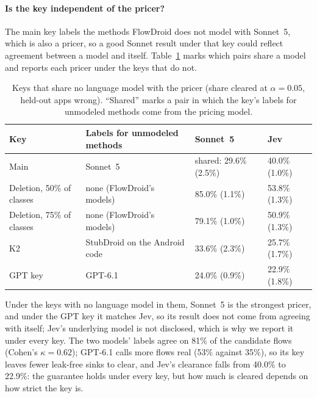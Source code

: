 \paragraph{Is the key independent of the pricer?}
The main key labels the methods FlowDroid does not model with Sonnet~5, which is also a pricer, so a good Sonnet result under that key could reflect agreement between a model and itself.
Table~\ref{tab:indep} marks which pairs share a model and reports each pricer under the keys that do not.
\begin{table}[t]
\caption{Keys that share no language model with the pricer (share cleared at $\alpha=0.05$, held-out apps wrong). ``Shared'' marks a pair in which the key's labels for unmodeled methods come from the pricing model.}
\label{tab:indep}
\small
\begin{tabular}{@{}llll@{}}
\toprule
Key & Labels for unmodeled methods & Sonnet~5 & Jev\\
\midrule
Main & Sonnet~5 & shared: 29.6\% (2.5\%) & 40.0\% (1.0\%)\\
Deletion, 50\% of classes & none (FlowDroid's models) & 85.0\% (1.1\%) & 53.8\% (1.3\%)\\
Deletion, 75\% of classes & none (FlowDroid's models) & 79.1\% (1.0\%) & 50.9\% (1.3\%)\\
K2 & StubDroid on the Android code & 33.6\% (2.3\%) & 25.7\% (1.7\%)\\
GPT key & GPT-6.1 & 24.0\% (0.9\%) & 22.9\% (1.8\%)\\
\bottomrule
\end{tabular}
\end{table}
Under the keys with no language model in them, Sonnet~5 is the strongest pricer, and under the GPT key it matches Jev, so its result does not come from agreeing with itself; Jev's underlying model is not disclosed, which is why we report it under every key.
The two models' labels agree on 81\% of the candidate flows (Cohen's $\kappa=0.62$); GPT-6.1 calls more flows real (53\% against 35\%), so its key leaves fewer leak-free sinks to clear, and Jev's clearance falls from 40.0\% to 22.9\%: the guarantee holds under every key, but how much is cleared depends on how strict the key is.

